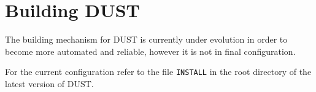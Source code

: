 \chapter{Building DUST}
The building mechanism for DUST is currently under evolution in order to become more automated and reliable, however it is not in final configuration. 

For the current configuration refer to the file \texttt{INSTALL} in the root directory of the latest version of DUST.